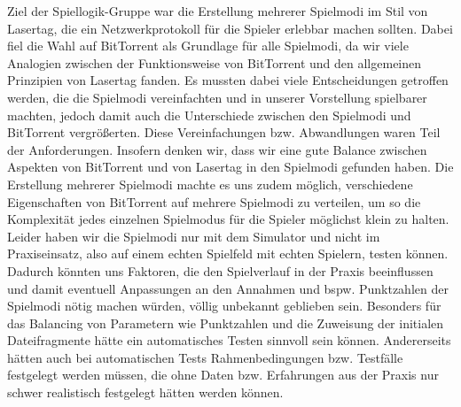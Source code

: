 Ziel der Spiellogik-Gruppe war die Erstellung mehrerer Spielmodi im Stil von 
Lasertag, die ein Netzwerkprotokoll für die Spieler erlebbar machen sollten. 
Dabei fiel die Wahl auf BitTorrent als Grundlage für alle Spielmodi, da wir viele 
Analogien zwischen der Funktionsweise von BitTorrent und den allgemeinen
Prinzipien von Lasertag fanden. Es mussten dabei viele Entscheidungen getroffen 
werden, die die Spielmodi vereinfachten und in unserer Vorstellung spielbarer
machten, jedoch damit auch die Unterschiede zwischen den Spielmodi und BitTorrent
vergrößerten. Diese Vereinfachungen bzw. Abwandlungen waren Teil der
Anforderungen. Insofern denken wir, dass wir eine gute Balance zwischen Aspekten 
von BitTorrent und von Lasertag in den Spielmodi gefunden haben. Die Erstellung
mehrerer Spielmodi machte es uns zudem möglich, verschiedene Eigenschaften von 
BitTorrent auf mehrere Spielmodi zu verteilen, um so die Komplexität jedes
einzelnen Spielmodus für die Spieler möglichst klein zu halten.
Leider haben wir die Spielmodi nur mit dem Simulator und nicht im Praxiseinsatz, 
also auf einem echten Spielfeld mit echten Spielern, testen können. Dadurch 
könnten uns Faktoren, die den Spielverlauf in der Praxis beeinflussen und damit
eventuell Anpassungen an den Annahmen und bspw. Punktzahlen der Spielmodi nötig 
machen würden, völlig unbekannt geblieben sein.
Besonders für das Balancing von Parametern wie Punktzahlen und die Zuweisung der
initialen Dateifragmente hätte ein automatisches Testen sinnvoll sein können.
Andererseits hätten auch bei automatischen Tests Rahmenbedingungen bzw. Testfälle 
festgelegt werden müssen, die ohne Daten bzw. Erfahrungen aus der Praxis nur schwer 
realistisch festgelegt hätten werden können.

